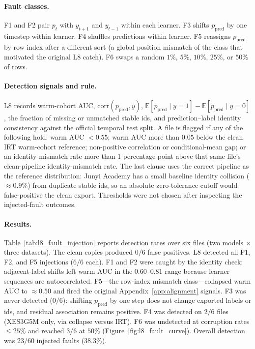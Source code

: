 \paragraph{Fault classes.}
F1 and F2 pair $p_t$ with $y_{t+1}$ and $y_{t-1}$ within each learner. F3 shifts $p_{\mathrm{pred}}$ by one timestep within learner. F4 shuffles predictions within learner. F5 reassigns $p_{\mathrm{pred}}$ by row index after a different sort (a global position mismatch of the class that motivated the original L8 catch). F6 swaps a random $1\%$, $5\%$, $10\%$, $25\%$, or $50\%$ of rows.

\paragraph{Detection signals and rule.}
L8 records warm-cohort AUC, $\mathrm{corr}(p_{\mathrm{pred}},y)$, $\mathbb{E}[p_{\mathrm{pred}}\mid y=1]-\mathbb{E}[p_{\mathrm{pred}}\mid y=0]$, the fraction of missing or unmatched stable ids, and prediction--label identity consistency against the official temporal test split. A file is flagged if any of the following hold: warm AUC $< 0.55$; warm AUC more than $0.05$ below the clean IRT warm-cohort reference; non-positive correlation or conditional-mean gap; or an identity-mismatch rate more than $1$ percentage point above that same file's clean-pipeline identity-mismatch rate. The last clause uses the correct pipeline as the reference distribution: Junyi Academy has a small baseline identity collision ($\approx 0.9\%$) from duplicate stable ids, so an absolute zero-tolerance cutoff would false-positive the clean export. Thresholds were not chosen after inspecting the injected-fault outcomes.

\paragraph{Results.}
Table~\ref{tab:l8_fault_injection} reports detection rates over six files (two models $\times$ three datasets). The clean copies produced $0/6$ false positives. L8 detected all F1, F2, and F5 injections ($6/6$ each). F1 and F2 were caught by the identity check: adjacent-label shifts left warm AUC in the $0.60$--$0.81$ range because learner sequences are autocorrelated. F5---the row-index mismatch class---collapsed warm AUC to $\approx 0.50$ and fired the original Appendix~\ref{app:alignment} signals. F3 was never detected ($0/6$): shifting $p_{\mathrm{pred}}$ by one step does not change exported labels or ids, and residual association remains positive. F4 was detected on $2/6$ files (XES3G5M only, via collapse versus IRT). F6 was undetected at corruption rates $\le 25\%$ and reached $3/6$ at $50\%$ (Figure~\ref{fig:l8_fault_curve}). Overall detection was $23/60$ injected faults ($38.3\%$).

